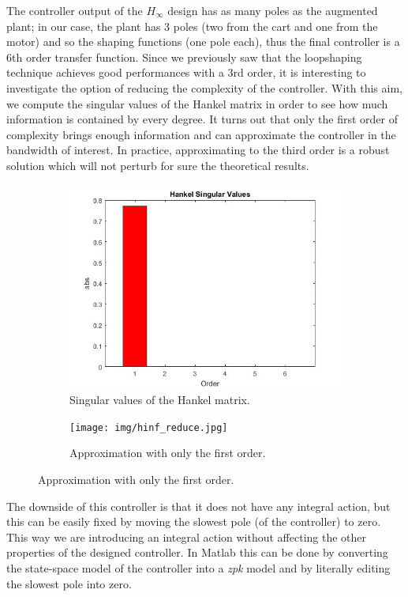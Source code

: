 The controller output of the $H_{\infty}$ design has as many poles as the augmented plant; in our case, the plant has 3 poles (two from the cart and one from the motor) and so the shaping functions (one pole each), thus the final controller is a 6th order transfer function. Since we previously saw that the loopshaping technique achieves good performances with a 3rd order, it is interesting to investigate the option of reducing the complexity of the controller. With this aim, we compute the singular values of the Hankel matrix in order to see how much information is contained by every degree. It turns out that only the first order of complexity brings enough information and can approximate the controller in the bandwidth of interest. In practice, approximating to the third order is a robust solution which will not perturb for sure the theoretical results.

\begin{figure}[H]

\begin{subfigure}{0.49\textwidth}
\includegraphics[width=\textwidth]{img/hinf_hankel.jpg}
\caption{Singular values of the Hankel matrix.}
\end{subfigure}

\begin{subfigure}{0.49\textwidth}
\texttt{[image: img/hinf\_reduce.jpg]}
\caption{Approximation with only the first order.}
\end{subfigure}

\end{figure}

The downside of this controller is that it does not have any integral action, but this can be easily fixed by moving the slowest pole (of the controller) to zero. This way we are introducing an integral action without affecting the other properties of the designed controller. In Matlab this can be done by converting the state-space model of the controller into a \emph{zpk} model and by literally editing the slowest pole into zero.\\


